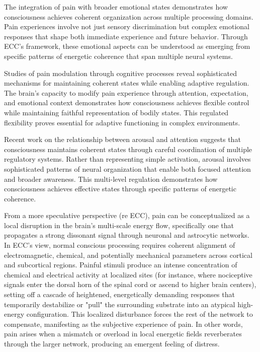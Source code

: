 \begin{refsection}
The integration of pain with broader emotional states \cite{Price2000} demonstrates how consciousness achieves coherent organization across multiple processing domains. Pain experiences involve not just sensory discrimination but complex emotional responses that shape both immediate experience and future behavior. Through ECC's framework, these emotional aspects can be understood as emerging from specific patterns of energetic coherence that span multiple neural systems.

Studies of pain modulation through cognitive processes \cite{Wiech2008} reveal sophisticated mechanisms for maintaining coherent states while enabling adaptive regulation. The brain's capacity to modify pain experience through attention, expectation, and emotional context demonstrates how consciousness achieves flexible control while maintaining faithful representation of bodily states. This regulated flexibility proves essential for adaptive functioning in complex environments.

Recent work on the relationship between arousal and attention \cite{Pfaff2006} suggests that consciousness maintains coherent states through careful coordination of multiple regulatory systems. Rather than representing simple activation, arousal involves sophisticated patterns of neural organization that enable both focused attention and broader awareness. This multi-level regulation demonstrates how consciousness achieves effective states through specific patterns of energetic coherence.

From a more speculative perspective (re ECC), pain can be conceptualized as a local disruption in the brain’s multi-scale energy flow, specifically one that propagates a strong dissonant signal through neuronal and astrocytic networks. In ECC’s view, normal conscious processing requires coherent alignment of electromagnetic, chemical, and potentially mechanical parameters across cortical and subcortical regions. Painful stimuli produce an intense concentration of chemical and electrical activity at localized sites (for instance, where nociceptive signals enter the dorsal horn of the spinal cord or ascend to higher brain centers), setting off a cascade of heightened, energetically demanding responses that temporarily destabilize or "pull" the surrounding substrate into an atypical high-energy configuration. This localized disturbance forces the rest of the network to compensate, manifesting as the subjective experience of pain. In other words, pain arises when a mismatch or overload in local energetic fields reverberates through the larger network, producing an emergent feeling of distress.


\end{refsection}
